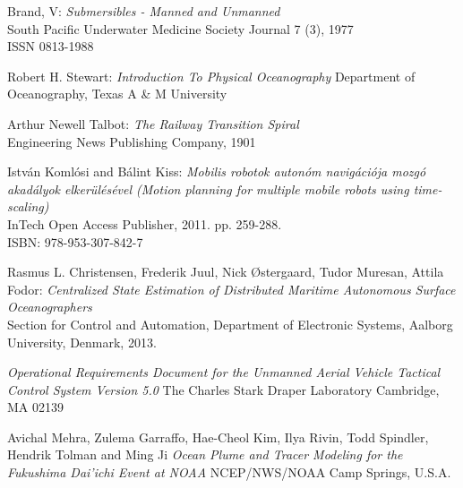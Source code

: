 \documentclass{article}
\begin{document}
\begin{thebibliography}{9}

  Brand, V:
  \emph{Submersibles - Manned and Unmanned}\\
  South Pacific Underwater Medicine Society Journal 7 (3), 1977\\
  ISSN 0813-1988
  
  Robert H. Stewart:
  \emph{Introduction To Physical Oceanography}
  Department of Oceanography, Texas A \& M University

  Arthur Newell Talbot:
  \emph{The Railway Transition Spiral}\\
  Engineering News Publishing Company, 1901

  Istv\'an Koml\'osi and B\'alint Kiss:
  \emph{Mobilis robotok auton\'om navig\'aci\'oja mozg\'o akad\'alyok elker\"ul\'es\'evel (Motion planning for multiple mobile robots using time-scaling)}\\
  InTech Open Access Publisher, 2011. pp. 259-288.\\
  ISBN: 978-953-307-842-7
  
	Rasmus L. Christensen, Frederik Juul, Nick \O stergaard, Tudor Muresan, Attila Fodor:
	\emph{Centralized State Estimation of Distributed Maritime Autonomous Surface Oceanographers}\\
	Section for Control and Automation, Department of Electronic Systems, Aalborg University, Denmark, 2013.
	
	
	\emph{Operational Requirements Document for the Unmanned Aerial Vehicle Tactical Control System Version 5.0}
	The Charles Stark Draper Laboratory Cambridge, MA 02139
	
	Avichal Mehra, Zulema Garraffo, Hae-Cheol Kim, Ilya Rivin, Todd Spindler, Hendrik Tolman and Ming Ji
	\emph{Ocean Plume and Tracer Modeling for the Fukushima Dai'ichi Event at NOAA}
	NCEP/NWS/NOAA Camp Springs, U.S.A.


\end{thebibliography}
\end{document}
